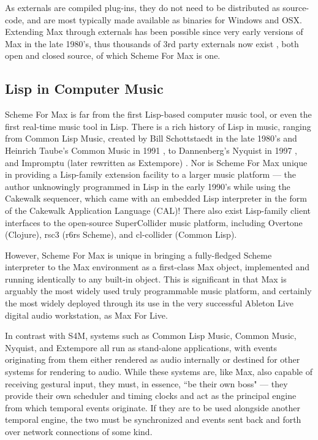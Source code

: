\documentclass[acmsmall]{acmart}
\begin{document}
As externals are compiled plug-ins, they do not need to be distributed as source-code, and
are most typically made available as binaries for Windows and OSX. Extending Max through externals has 
been possible since very early versions of Max in the late 1980's,
thus thousands of 3rd party externals 
now exist \cite{MaxObjects2021}, both open and closed source, of which Scheme For Max is one.


\subsection{Lisp in Computer Music}

Scheme For Max is far from the first Lisp-based computer music tool, or even
the first real-time music tool in Lisp. There is a rich history of Lisp in music, 
ranging from Common Lisp Music, created by Bill Schottstaedt in the late 1980's
\cite{Wang17} and Heinrich Taube's Common Music in 1991 \cite{Taube91},
to Dannenberg's Nyquist in 1997 \cite{Dannenberg97},
and Impromptu (later rewritten as Extempore) \cite{Sorensen2010}. 
Nor is Scheme For Max unique in providing a Lisp-family
extension facility to a larger music platform --- the author unknowingly
programmed in Lisp in the early 1990's while using the Cakewalk sequencer,
which came with an embedded Lisp interpreter in the form of the 
Cakewalk Application Language (CAL)! There also exist Lisp-family client interfaces
to the open-source SuperCollider music platform, including Overtone (Clojure),
rsc3 (r6rs Scheme), and cl-collider (Common Lisp).

However, Scheme For Max is unique in bringing a fully-fledged Scheme interpreter
to the Max environment as a first-class Max object, implemented and running
identically to any built-in object. This is significant in that Max
is arguably the most widely used truly programmable
music platform, and certainly the most widely deployed through its use in 
the very successful Ableton Live digital audio workstation, as Max For Live.

In contrast with S4M, systems such as Common Lisp Music, Common Music, Nyquist, and Extempore
all run as stand-alone applications, with events originating from them either
rendered as audio internally or destined for other systems for rendering to audio. 
While these systems are, like Max, also capable
of receiving gestural input, they must, in essence, ``be their own boss" --- they provide
their own scheduler and timing clocks and act as the principal engine from which temporal
events originate. If they are to be used alongside another temporal engine, the two
must be synchronized and events sent back and forth over network connections of some kind.
\end{document}
